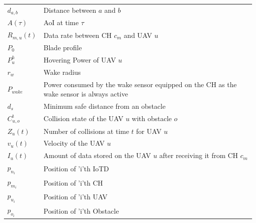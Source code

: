 \documentclass[conference]{IEEEtran}
\begin{document}
\begin{table}
\begin{tabular}{ p{0.85cm}|p{7.045cm} }
        $d_{a,b}$ & Distance between $a$ and $b$ \\
        \rowcolor{gray!20}
        $A(\tau)$ & AoI at time $\tau$ \\
        $R_{m,u}(t)$ & Data rate between CH $c_m$ and UAV $u$ \\
        \rowcolor{gray!20}
        \rowcolor{gray!20}
        \rowcolor{gray!20}
        $P_0$ & Blade profile \\
        $P_{u}^{h}$ & Hovering Power of UAV $u$ \\
        \rowcolor{gray!20}
        $r_{w}$ & Wake radius \\
        $P_{wake}$ & Power consumed by the wake sensor equipped on the CH as the wake sensor is always active \\
        \rowcolor{gray!20}
        $d_s$ & Minimum safe distance from an obstacle \\
        $C_{u,o}^{\text{t}}$ & Collision state of the UAV $u$ with obstacle $o$\\
        \rowcolor{gray!20}
        $Z_u(t)$ & Number of collisions at time $t$ for UAV $u$ \\
        $v_u(t)$ & Velocity of the UAV $u$ \\
        \rowcolor{gray!20}
        $I_u(t)$ & Amount of data stored on the UAV $u$ after receiving it from CH $c_m$ \\
        $p_{n_i}$ & Position of 'i'th IoTD\\
        \rowcolor{gray!20}
        $p_{m_i}$ & Position of 'i'th CH\\
        $p_{u_i}$ & Position of 'i'th UAV\\
        \rowcolor{gray!20}
        $p_{o_i}$ & Position of 'i'th Obstacle\\
        \hline
    \end{tabular}
\end{table}
\end{document}
